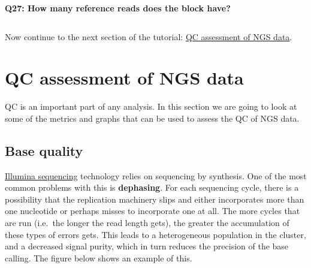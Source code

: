 \documentclass[11pt]{article}
\makeatletter
\newcommand{\boxspacing}{\kern\kvtcb@left@rule\kern\kvtcb@boxsep}
\newcommand{\prompt}[4]{
        {\ttfamily\llap{{\color{#2}[#3]:\hspace{3pt}#4}}\vspace{-\baselineskip}}
    }
\makeatother
\begin{document}
    \textbf{Q27: How many reference reads does the block have?}

    \begin{tcolorbox}[breakable, size=fbox, boxrule=1pt, pad at break*=1mm,colback=cellbackground, colframe=cellborder]
\prompt{In}{incolor}{ }{\boxspacing}
\begin{Verbatim}[commandchars=\\\{\}]

\end{Verbatim}
\end{tcolorbox}

    Now continue to the next section of the tutorial:
\href{assessment.ipynb}{QC assessment of NGS data}.





\newpage





    \hypertarget{qc-assessment-of-ngs-data}{%
\section{QC assessment of NGS data}\label{qc-assessment-of-ngs-data}}

QC is an important part of any analysis. In this section we are going to
look at some of the metrics and graphs that can be used to assess the QC
of NGS data.

\hypertarget{base-quality}{%
\subsection{Base quality}\label{base-quality}}

\href{https://en.wikipedia.org/wiki/Illumina_dye_sequencing}{Illumina
sequencing} technology relies on sequencing by synthesis. One of the
most common problems with this is \textbf{dephasing}. For each
sequencing cycle, there is a possibility that the replication machinery
slips and either incorporates more than one nucleotide or perhaps misses
to incorporate one at all. The more cycles that are run (i.e.~the longer
the read length gets), the greater the accumulation of these types of
errors gets. This leads to a heterogeneous population in the cluster,
and a decreased signal purity, which in turn reduces the precision of
the base calling. The figure below shows an example of this.
\end{document}
